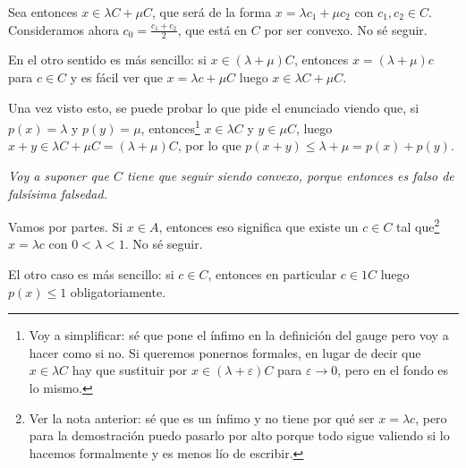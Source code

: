 \begin{problem}
Sea entonces $x ∈ λC + μC$, que será de la forma $x = λc_1 + μc_2$ con $c_1, c_2 ∈ C$. Consideramos ahora $c_0 = \frac{c_1 + c_2}{2}$, que está en $C$ por ser convexo. No sé seguir. %

En el otro sentido es más sencillo: si $x ∈ (λ + μ)C$, entonces $x = (λ + μ)c$ para $c ∈ C$ y es fácil ver que $x = λc + μC$ luego $x ∈ λC + μC$.

Una vez visto esto, se puede probar lo que pide el enunciado viendo que, si $p(x) = λ$ y $p(y) = μ$, entonces\footnote{Voy a simplificar: sé que pone el ínfimo en la definición del gauge pero voy a hacer como si no. Si queremos ponernos formales, en lugar de decir que $x ∈ λC$ hay que sustituir por $x ∈ (λ + ε)C$ para $ε \to 0$, pero en el fondo es lo mismo.} $x ∈ λC$ y $y ∈ μC$, luego $x + y ∈ λC + μC = (λ + μ) C$, por lo que $p(x + y) ≤ λ + μ = p(x) + p(y)$.

\spart

\textit{Voy a suponer que $C$ tiene que seguir siendo convexo, porque entonces es falso de falsísima falsedad.}

Vamos por partes. Si $x ∈ A$, entonces eso significa que existe un $c ∈ C$ tal que\footnote{Ver la nota anterior: sé que es un ínfimo y no tiene por qué ser $x = λc$, pero para la demostración puedo pasarlo por alto porque todo sigue valiendo si lo hacemos formalmente y es menos lío de escribir.} $x = λc$ con $0 < λ < 1$. No sé seguir. %

El otro caso es más sencillo: si $c ∈ C$, entonces en particular $c ∈ 1C$ luego $p(x) ≤ 1$ obligatoriamente.

\spart


\end{problem}

